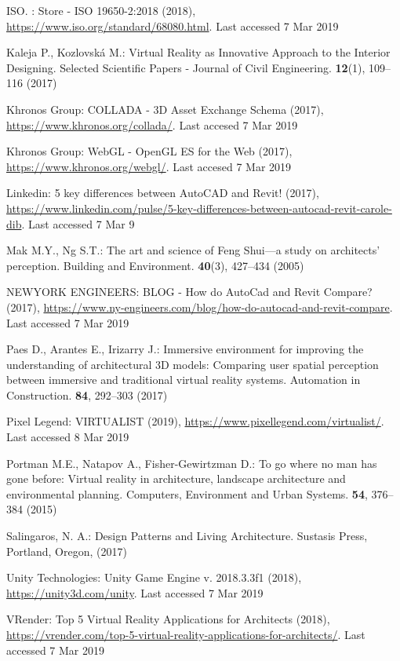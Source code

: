 \documentclass[runningheads]{llncs}
\begin{document}
\begin{thebibliography}{8}
ISO. : Store - ISO 19650-2:2018 (2018), \url{https://www.iso.org/standard/68080.html}. 
Last accessed 7 Mar 2019

Kaleja P., Kozlovská M.: Virtual Reality as Innovative Approach to the Interior Designing. Selected Scientific
Papers - Journal of Civil Engineering. \textbf{12}(1), 109--116 (2017)

Khronos Group: COLLADA - 3D Asset Exchange Schema (2017), 
\url{https://www.khronos.org/collada/}. Last accesed 7 Mar 2019

Khronos Group: WebGL - OpenGL ES for the Web (2017), 
\url{https://www.khronos.org/webgl/}. Last accesed 7 Mar 2019

Linkedin: 5 key differences between AutoCAD and Revit! (2017), 
\url{https://www.linkedin.com/pulse/5-key-differences-between-autocad-revit-carole-dib}. Last accessed 7 Mar 9

Mak M.Y., Ng S.T.: The art and science of Feng Shui—a study on architects’ perception. Building and
Environment. \textbf{40}(3), 427--434 (2005)

NEWYORK ENGINEERS: BLOG - How do AutoCad and Revit Compare? (2017), 
\url{https://www.ny-engineers.com/blog/how-do-autocad-and-revit-compare}. 
Last accessed 7 Mar 2019

Paes D., Arantes E., Irizarry J.: Immersive environment for improving the understanding of architectural 3D
models: Comparing user spatial perception between immersive and traditional virtual reality systems.
Automation in Construction. \textbf{84}, 292--303 (2017)

Pixel Legend: VIRTUALIST (2019), \url{https://www.pixellegend.com/virtualist/}. Last accessed 8 Mar 2019

Portman M.E., Natapov A., Fisher-Gewirtzman D.: To go where no man has gone before: Virtual reality in
architecture, landscape architecture and environmental planning. Computers, Environment and Urban Systems.
\textbf{54}, 376--384 (2015)

Salingaros, N. A.: Design Patterns and Living Architecture. Sustasis Press, Portland, Oregon, (2017) 

Unity Technologies: Unity Game Engine v. 2018.3.3f1 (2018), 
\url{https://unity3d.com/unity}. Last accessed 7 Mar 2019

VRender: Top 5 Virtual Reality Applications for Architects (2018),
\url{https://vrender.com/top-5-virtual-reality-applications-for-architects/}. 
Last accessed 7 Mar 2019


\end{thebibliography}
\end{document}
